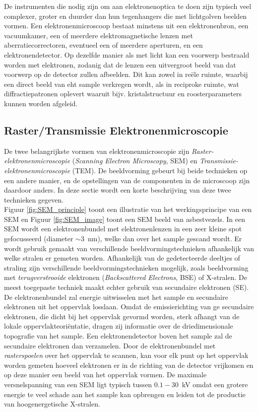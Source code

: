 \documentclass[we,twoside,openright,a4paper,11pt]{uantwerpenbamathesis}
\begin{document}
De instrumenten die nodig zijn om aan elektronenoptica te doen zijn typisch veel complexer, groter en duurder dan hun tegenhangers die met lichtgolven beelden vormen. Een elektronenmicroscoop bestaat minstens uit een elektronenbron, een vacuumkamer, een of meerdere elektromagnetische lenzen met aberratiecorrectoren, eventueel een of meerdere aperturen, en een elektronendetector. Op dezelfde manier als met licht kan een voorwerp bestraald worden met elektronen, zodanig dat de lenzen een uitvergroot beeld van dat voorwerp op de detector zullen afbeelden. Dit kan zowel in reële ruimte, waarbij een direct beeld van eht sample verkregen wordt, als in reciproke ruimte, wat diffractiepatronen oplevert waaruit bijv. kristalstructuur en roosterparameters kunnen worden afgeleid.

\subsection{Raster/Transmissie Elektronenmicroscopie}
De twee belangrijkste vormen van elektronenmicroscopie zijn \textit{Raster-elektronenmicroscopie} (\textit{Scanning Electron Microscopy}, SEM) en \textit{Transmissie-elektronenmicroscopie} (TEM). De beeldvorming gebeurt bij beide technieken op een andere manier, en de opstellingen van de componenten in de microscoop zijn daardoor anders. In deze sectie wordt een korte beschrijving van deze twee technieken gegeven.\\

Figuur \ref{fig:SEM_principle} toont een illustratie van het werkingsprincipe van een SEM en Figuur \ref{fig:SEM_image} toont een SEM beeld van asbestvezels. In een SEM wordt een elektronenbundel met elektronenlenzen in een zeer kleine spot gefocusseerd (diameter $\sim 3$~nm), welke dan over het sample gescand wordt. Er wordt gebruik gemaakt van verschillende beeldvormingstechnieken afhankelijk van welke stralen er gemeten worden. Afhankelijk van de gedetecteerde deeltjes of straling zijn verschillende beeldvormingstechnieken mogelijk, zoals beeldvorming met \textit{terugverstrooide} elektronen (\textit{Backscattered Electrons}, BSE) of X-stralen. De meest toegepaste techniek maakt echter gebruik van secundaire elektronen (SE). De elektronenbundel zal energie uitwisselen met het sample en secundaire elektronen uit het oppervlak losslaan. Omdat de emissierichting van ge secundaire elektronen, die dicht bij het oppervlak gevormd worden, sterk afhangt van de lokale oppervlakteoriëntatie, dragen zij informatie over de driedimensionale topografie van het sample. Een elektronendetector boven het sample zal de secundaire elektronen dan verzamelen. Door de elektronenbundel met \textit{rasterspoelen} over het oppervlak te scannen, kan voor elk punt op het oppervlak worden gemeten hoeveel elektronen er in de richting van de detector vrijkomen en op deze manier een beeld van het oppervlak vormen. De maximale versnelspanning van een SEM ligt typisch tussen $0.1-30$~kV \cite{PWHawkes} omdat een grotere energie te veel schade aan het sample kan opbrengen en leiden tot de productie van hoogenergetische X-stralen.\\
\end{document}
